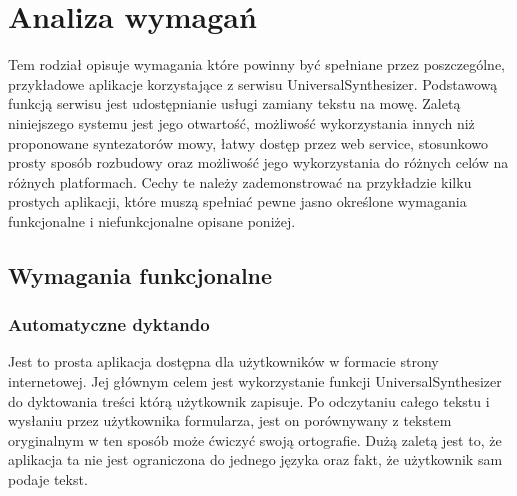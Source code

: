 
\chapter{Analiza wymagań} %



\ifpdf
    \graphicspath{{3/figures/PNG/}{3/figures/PDF/}{3/figures/}}
\else
    \graphicspath{{3/figures/EPS/}{3/figures/}}
\fi


Tem rodział opisuje wymagania które powinny być spełniane przez poszczególne, przykładowe aplikacje korzystające z serwisu UniversalSynthesizer. Podstawową funkcją serwisu jest udostępnianie usługi zamiany tekstu na mowę. Zaletą niniejszego systemu jest jego otwartość, możliwość wykorzystania innych niż proponowane syntezatorów mowy, łatwy dostęp przez web service, stosunkowo prosty sposób rozbudowy oraz możliwość jego wykorzystania do różnych celów na różnych platformach. Cechy te należy zademonstrować na przykładzie kilku prostych aplikacji, które muszą spełniać pewne jasno określone wymagania funkcjonalne i niefunkcjonalne opisane poniżej. 
\section{Wymagania funkcjonalne}

\subsection{Automatyczne dyktando}
Jest to prosta aplikacja dostępna dla użytkowników w formacie strony internetowej. Jej głównym celem jest wykorzystanie funkcji UniversalSynthesizer do dyktowania treści którą użytkownik zapisuje. Po odczytaniu całego tekstu i wysłaniu przez użytkownika formularza, jest on porównywany z tekstem oryginalnym w ten sposób może ćwiczyć swoją ortografie. Dużą zaletą jest to, że aplikacja ta nie jest ograniczona do jednego języka oraz fakt, że użytkownik sam podaje tekst.
